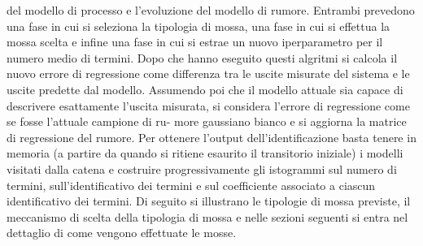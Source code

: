 del modello di processo e l’evoluzione del modello di rumore.
Entrambi prevedono una fase in cui si seleziona la tipologia di mossa, una fase in cui
si effettua la mossa scelta e infine una fase in cui si estrae un nuovo iperparametro
per il numero medio di termini.
Dopo che hanno eseguito questi algritmi si calcola il nuovo errore di regressione come
differenza tra le uscite misurate del sistema e le uscite predette dal modello.
Assumendo poi che il modello attuale sia capace di descrivere esattamente l’uscita
misurata, si considera l’errore di regressione come se fosse l’attuale campione di ru-
more gaussiano bianco e si aggiorna la matrice di regressione del rumore.
Per ottenere l’output dell’identificazione basta tenere in memoria (a partire da
quando si ritiene esaurito il transitorio iniziale) i modelli visitati dalla catena e
costruire progressivamente gli istogrammi sul numero di termini, sull’identificativo
dei termini e sul coefficiente associato a ciascun identificativo dei termini. Di seguito
si illustrano le tipologie di mossa previste, il meccanismo di scelta della tipologia di
mossa e nelle sezioni seguenti si entra nel dettaglio di come vengono effettuate le
mosse.
